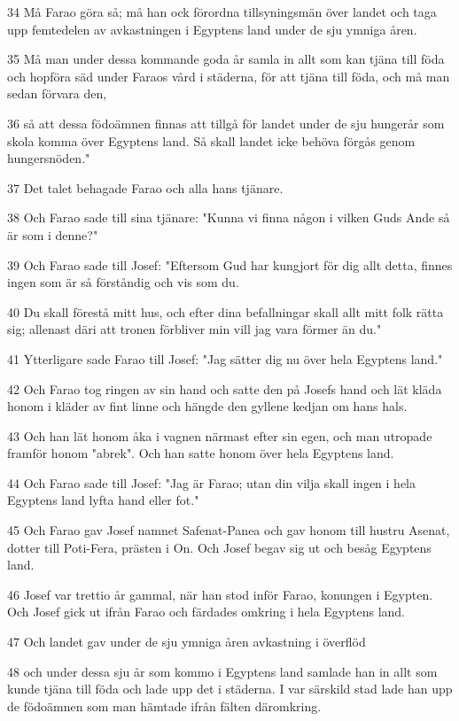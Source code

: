 \par 34 Må Farao göra så; må han ock förordna tillsyningsmän över landet och taga upp femtedelen av avkastningen i Egyptens land under de sju ymniga åren.
\par 35 Må man under dessa kommande goda år samla in allt som kan tjäna till föda och hopföra säd under Faraos vård i städerna, för att tjäna till föda, och må man sedan förvara den,
\par 36 så att dessa födoämnen finnas att tillgå för landet under de sju hungerår som skola komma över Egyptens land. Så skall landet icke behöva förgås genom hungersnöden."
\par 37 Det talet behagade Farao och alla hans tjänare.
\par 38 Och Farao sade till sina tjänare: "Kunna vi finna någon i vilken Guds Ande så är som i denne?"
\par 39 Och Farao sade till Josef: "Eftersom Gud har kungjort för dig allt detta, finnes ingen som är så förståndig och vis som du.
\par 40 Du skall förestå mitt hus, och efter dina befallningar skall allt mitt folk rätta sig; allenast däri att tronen förbliver min vill jag vara förmer än du."
\par 41 Ytterligare sade Farao till Josef: "Jag sätter dig nu över hela Egyptens land."
\par 42 Och Farao tog ringen av sin hand och satte den på Josefs hand och lät kläda honom i kläder av fint linne och hängde den gyllene kedjan om hans hals.
\par 43 Och han lät honom åka i vagnen närmast efter sin egen, och man utropade framför honom "abrek". Och han satte honom över hela Egyptens land.
\par 44 Och Farao sade till Josef: "Jag är Farao; utan din vilja skall ingen i hela Egyptens land lyfta hand eller fot."
\par 45 Och Farao gav Josef namnet Safenat-Panea och gav honom till hustru Asenat, dotter till Poti-Fera, prästen i On. Och Josef begav sig ut och besåg Egyptens land.
\par 46 Josef var trettio år gammal, när han stod inför Farao, konungen i Egypten. Och Josef gick ut ifrån Farao och färdades omkring i hela Egyptens land.
\par 47 Och landet gav under de sju ymniga åren avkastning i överflöd
\par 48 och under dessa sju år som kommo i Egyptens land samlade han in allt som kunde tjäna till föda och lade upp det i städerna. I var särskild stad lade han upp de födoämnen som man hämtade ifrån fälten däromkring.

